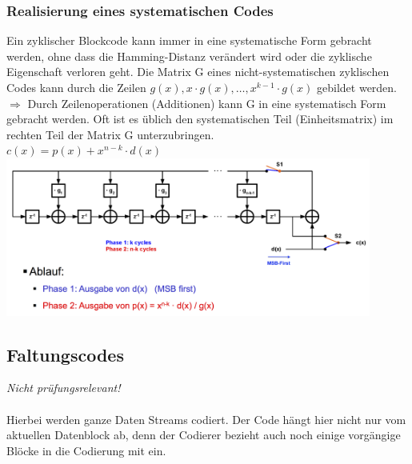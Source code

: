 \subsubsection{Realisierung eines systematischen Codes}
Ein zyklischer Blockcode kann immer in eine systematische Form gebracht werden, ohne dass die
Hamming-Distanz verändert wird oder die zyklische Eigenschaft verloren geht.
Die Matrix G eines nicht-systematischen zyklischen Codes kann durch die Zeilen $g(x), x\cdot g(x), \ldots, x^{k-1}\cdot g(x)$ gebildet werden. 
$\Rightarrow$ Durch Zeilenoperationen (Additionen) kann G in eine systematisch Form gebracht werden. Oft ist es üblich den systematischen Teil (Einheitsmatrix) im rechten Teil der Matrix G unterzubringen.\\
\hspace*{0.5cm}$ c(x) = p(x) + x^{n-k}\cdot d(x)$\\
\includegraphics[width = 12cm]{./bilder/11_cyc_hw_imp_sys_code}

\subsection{Faltungscodes }
\textit{Nicht prüfungsrelevant!}\\ \\
Hierbei werden ganze Daten Streams codiert. Der Code hängt hier nicht nur vom aktuellen Datenblock
ab, denn der Codierer bezieht auch noch einige vorgängige Blöcke in die Codierung mit ein.
